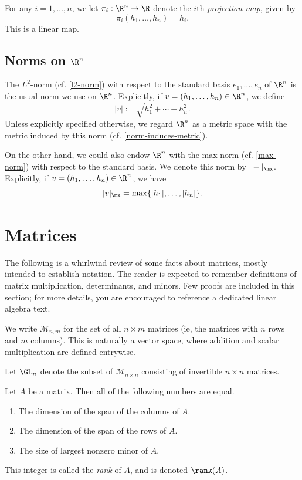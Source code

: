 For any $i = 1, \dotsc, n$, we let $\pi_i : \R^n \to \R$ denote the $i$th \emph{projection map}, given by 
\[ \pi_i(h_1, \dotsc, h_n) = h_i. \]
This is a linear map. 

\subsection{Norms on \texorpdfstring{$\R^n$}{Rn}}

The $L^2$-norm (cf. \cref{l2-norm}) with respect to the standard basis $e_1, \dotsc, e_n$ of $\R^n$ is the usual norm we use on $\R^n$. Explicitly, if $v = (h_1, \dotsc, h_n) \in \R^n$, we define
\[ |v| := \sqrt{h_1^2 + \dotsb + h_n^2}. \]
Unless explicitly specified otherwise, we regard $\R^n$ as a metric space with the metric induced by this norm (cf. \cref{norm-induces-metric}). 

On the other hand, we could also endow $\R^n$ with the max norm (cf. \cref{max-norm}) with respect to the standard basis. We denote this norm by $|-|_\mx$. Explicitly, if $v = (h_1, \dotsc, h_n) \in \R^n$, we have
\[ |v|_\mx = \max\{ |h_1|, \dotsc, |h_n| \}. \]

\section{Matrices}

The following is a whirlwind review of some facts about matrices, mostly intended to establish notation. The reader is expected to remember definitions of matrix multiplication, determinants, and minors. Few proofs are included in this section; for more details, you are encouraged to reference a dedicated linear algebra text.

\begin{definition}
	We write $\mathscr{M}_{n,m}$ for the set of all $n \times m$ matrices (ie, the matrices with $n$ rows and $m$ columns). This is naturally a vector space, where addition and scalar multiplication are defined entrywise.  
\end{definition}

\begin{definition}
	Let $\GL_n$ denote the subset of $\mathscr{M}_{n \times n}$ consisting of invertible $n \times n$ matrices.
\end{definition}

\begin{lemma}
	Let $A$ be a matrix. Then all of the following numbers are equal. 
	\begin{enumerate}[(1)]
		\item The dimension of the span of the columns of $A$. \item The dimension of the span of the rows of $A$. 
		\item The size of largest nonzero minor of $A$. 
	\end{enumerate}
	This integer is called the \emph{rank} of $A$, and is denoted $\rank(A)$. 
\end{lemma}

